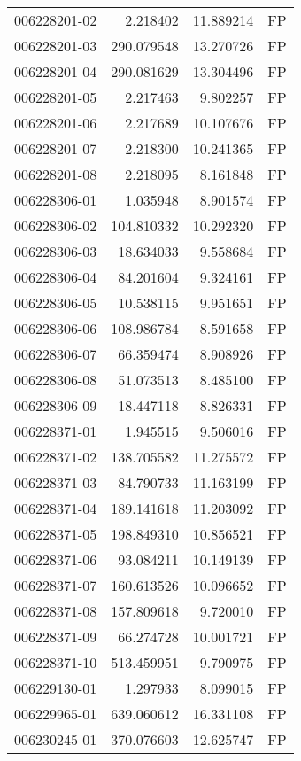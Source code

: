 \begin{tabular}{lrrl}
006228201-02 &    2.218402 &    11.889214 &   FP \\
006228201-03 &  290.079548 &    13.270726 &   FP \\
006228201-04 &  290.081629 &    13.304496 &   FP \\
006228201-05 &    2.217463 &     9.802257 &   FP \\
006228201-06 &    2.217689 &    10.107676 &   FP \\
006228201-07 &    2.218300 &    10.241365 &   FP \\
006228201-08 &    2.218095 &     8.161848 &   FP \\
006228306-01 &    1.035948 &     8.901574 &   FP \\
006228306-02 &  104.810332 &    10.292320 &   FP \\
006228306-03 &   18.634033 &     9.558684 &   FP \\
006228306-04 &   84.201604 &     9.324161 &   FP \\
006228306-05 &   10.538115 &     9.951651 &   FP \\
006228306-06 &  108.986784 &     8.591658 &   FP \\
006228306-07 &   66.359474 &     8.908926 &   FP \\
006228306-08 &   51.073513 &     8.485100 &   FP \\
006228306-09 &   18.447118 &     8.826331 &   FP \\
006228371-01 &    1.945515 &     9.506016 &   FP \\
006228371-02 &  138.705582 &    11.275572 &   FP \\
006228371-03 &   84.790733 &    11.163199 &   FP \\
006228371-04 &  189.141618 &    11.203092 &   FP \\
006228371-05 &  198.849310 &    10.856521 &   FP \\
006228371-06 &   93.084211 &    10.149139 &   FP \\
006228371-07 &  160.613526 &    10.096652 &   FP \\
006228371-08 &  157.809618 &     9.720010 &   FP \\
006228371-09 &   66.274728 &    10.001721 &   FP \\
006228371-10 &  513.459951 &     9.790975 &   FP \\
006229130-01 &    1.297933 &     8.099015 &   FP \\
006229965-01 &  639.060612 &    16.331108 &   FP \\
006230245-01 &  370.076603 &    12.625747 &   FP \\

\end{tabular}
